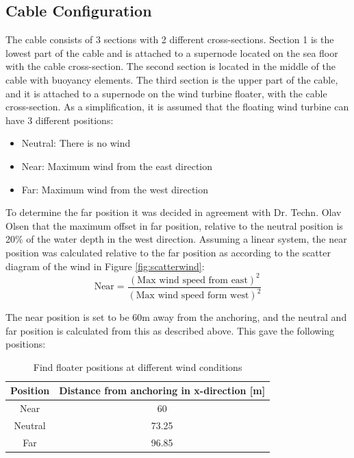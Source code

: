 \subsection{Cable Configuration}
The cable consists of 3 sections with 2 different cross-sections. Section 1 is the lowest part of the cable and is attached to a supernode located on the sea floor with the cable cross-section. The second section is located in the middle of the cable with buoyancy elements. The third section is the upper part of the cable, and it is attached to a supernode on the wind turbine floater, with the cable cross-section.\newline
\newline 
\noindent As a simplification, it is assumed that the floating wind turbine can have 3 different positions:
\begin{itemize}
    \item Neutral: There is no wind
    \item Near: Maximum wind from the east direction
    \item Far: Maximum wind from the west direction
\end{itemize}
To determine the far position it was decided in agreement with Dr. Techn. Olav Olsen that the maximum offset in far position, relative to the neutral position is 20\% of the water depth in the west direction. Assuming a linear system, the near position was calculated relative to the far position as according to the scatter diagram of the wind in Figure \ref{fig:scatterwind}:
\begin{equation}
    \text{Near}=\frac{(\text{Max  wind speed from east})^2}{(\text{Max wind speed form west})^2}
\end{equation}

\noindent The near position is set to be 60m away from the anchoring, and the neutral and far position is calculated from this as described above. This gave the following positions: 
\begin{table} [H]
\centering
\begin{tabular}{ |c|c|}
\hline
Position & Distance from anchoring in x-direction [m] \\
 \hline
 \hline
 
Near & 60\\

Neutral & 73.25\\

Far & 96.85 \\
 
 \hline
\end{tabular}
\caption{Find floater positions at different wind conditions}
\label{table:pos}
\end{table}

